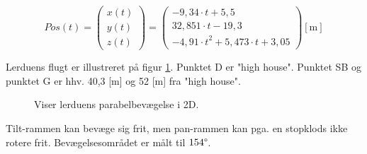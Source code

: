 \begin{equation}
Pos\left( t \right) = 
\left( \begin{matrix} 
	x\left( t \right)  \\ 
	y\left( t \right)  \\ 
	z\left( t \right)  \end{matrix} \right) =
	 \left( \begin{matrix} 
	- 9,34\cdot t+5,5 \\
  32,851\cdot t-19,3 \\ 
 -{ 4,91\cdot t }^{ 2 }+5,473\cdot t+3,05\end{matrix} \right) [\text{m}]
\label{eq:ks:vektorparabel3d}
\end{equation}

Lerduens flugt er illustreret på figur \ref{fig:para_total}.
Punktet D er "high house".
Punktet SB og punktet G er hhv. 40,3 [m] og 52 [m] fra "high house". \\
\begin{figure}[h!]
\centering
{}
\caption[Lerduens parabel i 2D]{Viser lerduens parabelbevægelse i 2D.}
\label{fig:para_total}
\end{figure}

Tilt-rammen kan bevæge sig frit,
men pan-rammen kan pga. en stopklods ikke rotere frit.
Bevægelsesområdet er målt til \(154 \degree\).

